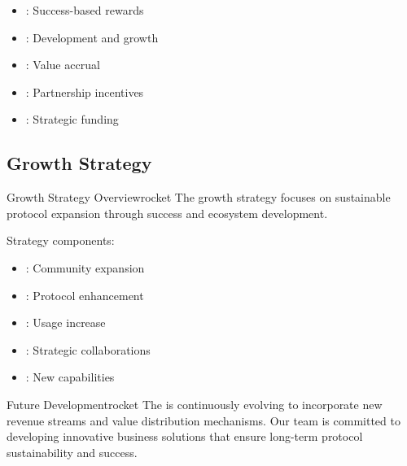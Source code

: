 \begin{itemize}[leftmargin=*]
\item {}: Success-based rewards
\item {}: Development and growth
\item {}: Value accrual
\item {}: Partnership incentives
\item {}: Strategic funding
\end{itemize}

\subsection{Growth Strategy}

\begin{mfai-box-prove}{Growth Strategy Overview}{rocket}
The growth strategy focuses on sustainable protocol expansion through  success and ecosystem development.
\end{mfai-box-prove}

Strategy components:

\begin{itemize}[leftmargin=*]
\item {}: Community expansion
\item {}: Protocol enhancement
\item {}: Usage increase
\item {}: Strategic collaborations
\item {}: New capabilities
\end{itemize}

\begin{center}
\end{center}

\begin{mfai-box-scale}{Future Development}{rocket}
The  is continuously evolving to incorporate new revenue streams and value distribution mechanisms. Our team is committed to developing innovative business solutions that ensure long-term protocol sustainability and  success.
\end{mfai-box-scale}

\newpage 